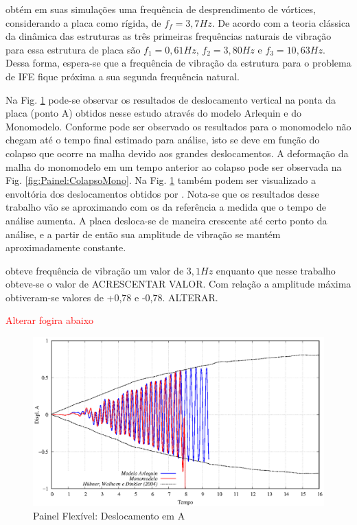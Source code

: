 \documentclass[tese_patricia]{subfiles}
\begin{document}
 obtém em suas simulações uma frequência de desprendimento de vórtices, considerando a placa como rígida, de $f_f = 3,7Hz$. De acordo com a teoria clássica da dinâmica das estruturas as três primeiras frequências naturais de vibração para essa estrutura de placa são $f_1 = 0,61Hz$, $f_2 = 3,80Hz$ e $f_3 = 10,63Hz$. Dessa forma, espera-se que a frequência de vibração da estrutura para o problema de IFE fique próxima a sua segunda frequência natural.

Na Fig. \ref{fig:Painel:DeslocamentoPONTA} pode-se observar os resultados de deslocamento vertical na ponta da placa (ponto A) obtidos nesse estudo através do modelo Arlequin e do Monomodelo. Conforme pode ser observado os resultados para o monomodelo não chegam até o tempo final estimado para análise, isto se deve em função do colapso que ocorre na malha devido aos grandes deslocamentos. A deformação da malha do monomodelo em um tempo anterior ao colapso pode ser observada na Fig. \ref{fig:Painel:ColapsoMono}. Na Fig. \ref{fig:Painel:DeslocamentoPONTA} também podem ser visualizado a envoltória dos deslocamentos obtidos por . Nota-se que os resultados desse trabalho vão se aproximando com os da referência a medida que o tempo de análise aumenta. A placa desloca-se de maneira crescente até certo ponto da análise, e a partir de então sua amplitude de vibração se mantém aproximadamente constante.

 
 obteve frequência de vibração um valor de $3,1Hz$ enquanto que nesse trabalho obteve-se o valor de ACRESCENTAR VALOR. Com relação a amplitude máxima obtiveram-se valores de +0,78 e -0,78. ALTERAR.

\textcolor{red}{Alterar fogira abaixo}

\begin{figure}[htb!]
	\centering 
	\includegraphics[scale=1.0,trim=0cm 0cm 0cm 0cm, clip=true]{Imagens/Cap7/deslocamentoPONTAPlaca.eps}	
	\caption{Painel Flexível: Deslocamento em A}
	\label{fig:Painel:DeslocamentoPONTA}
\end{figure}
\end{document}
